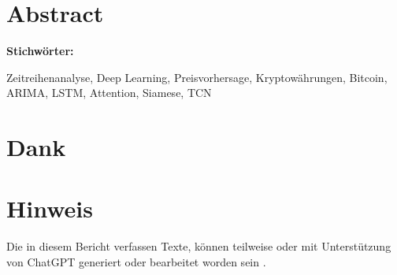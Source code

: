 \section*{Abstract}

\lipsum[]

\vspace{2ex}

\textbf{Stichwörter:}

Zeitreihenanalyse, Deep Learning, Preisvorhersage, Kryptowährungen, Bitcoin, ARIMA, LSTM, Attention, Siamese, TCN

\clearpage

\section*{Dank}

\lipsum[]

\clearpage

\section*{Hinweis}

Die in diesem Bericht verfassen Texte, können teilweise oder mit Unterstützung von ChatGPT generiert oder bearbeitet worden sein \parencite{noauthor_chatgpt_2024}.